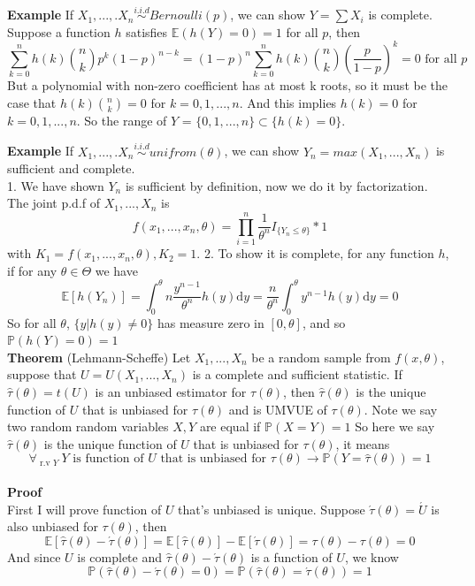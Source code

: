 \documentclass[a4paper,12pt]{article}
\begin{document}
\textbf{Example} If $X_1, ..., .X_n \overset{i.i.d}{\sim} Bernoulli(p)$, we can show $Y = \sum X_i$ is complete. Suppose a function $h$ satisfies $\mathbb{E}( h(Y) = 0 ) = 1$ for all $p$, then
$$\sum_{k=0}^n h(k) {n \choose k} p^k(1-p)^{n-k} = (1-p)^n\sum_{k=0}^n h(k) {n \choose k} (\frac{p}{1-p})^k = 0 \text{ for all } p$$
But a polynomial with non-zero coefficient has at most k roots, so it must be the case that $h(k) {n \choose k} = 0 $ for $k = 0, 1, ..., n$. And this implies $h(k)= 0 $ for $k = 0, 1, ..., n$. So the range of $Y$ = $\{0, 1, ..., n \} \subset \{h(k)= 0\}$.

\textbf{Example} If $X_1, ..., .X_n \overset{i.i.d}{\sim} unifrom(\theta)$, we can show $Y_n = max(X_1, ..., X_n)$ is sufficient and complete.\\
1. We have shown $Y_n$ is sufficient by definition, now we do it by factorization. The joint p.d.f of $X_1, ..., X_n$ is
$$f(x_1, ..., x_n, \theta) = \prod_{i=1}^n \frac{1}{\theta^n} I_{\{Y_n \leq \theta\}} * 1$$
with $K_1 = f(x_1, ..., x_n, \theta), K_2 = 1$.
2. To show it is complete, for any function $h$, if for any $\theta\in\Theta$ we have
$$\mathbb{E}[ h(Y_n) ] = \int_0^\theta n\frac{y^{n-1}}{\theta^n}h(y) \mathrm{d}y = \frac{n}{\theta^n} \int_0^\theta y^{n-1}h(y) \mathrm{d}y = 0$$
So for all $\theta$, $\{ y | h(y) \neq 0 \}$ has measure zero in $[0, \theta]$, and so $\mathbb{P}( h(Y) = 0 ) = 1$\\

\textbf{Theorem} (Lehmann-Scheffe) Let $X_1, ..., X_n$ be a random sample from $f(x, \theta)$, suppose that $U = U(X_1, ..., X_n)$ is a complete and sufficient statistic. If $\hat{\tau}(\theta) = t(U)$ is an unbiased estimator for $\tau(\theta)$, then $\hat{\tau}(\theta)$ is the unique function of $U$ that is unbiased for $\tau(\theta)$ and is UMVUE of $\tau(\theta)$. Note we say two random random variables $X, Y$ are equal if $\mathbb{P}( X = Y ) = 1$ So here we say $\hat{\tau}(\theta)$ is the unique function of $U$ that is unbiased for $\tau(\theta)$, it means
$$\forall_{\text{ r.v } Y } \ Y \text{ is function of } U \text{ that is unbiased for } \tau(\theta) \to \mathbb{P}(Y = \hat{\tau}(\theta)) = 1$$\\

\textbf{Proof}\\
First I will prove function of $U$ that's unbiased is unique. Suppose $\acute{\tau}(\theta) = \acute{U}$ is also unbiased for $\tau(\theta)$, then
$$\mathbb{E}[ \hat{\tau}(\theta) - \acute{\tau}(\theta) ] = \mathbb{E}[ \hat{\tau}(\theta) ] - \mathbb{E}[ \acute{\tau}(\theta) ] = \tau(\theta) - \tau(\theta) = 0$$
And since $U$ is complete and $\hat{\tau}(\theta) - \acute{\tau}(\theta)$ is a function of $U$, we know 
$$\mathbb{P}( \hat{\tau}(\theta) - \acute{\tau}(\theta) = 0 ) = \mathbb{P}( \hat{\tau}(\theta) = \acute{\tau}(\theta) ) = 1$$
\end{document}
